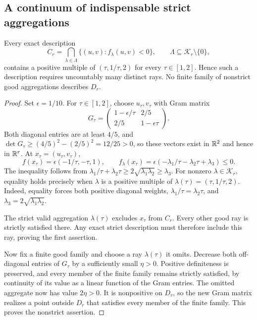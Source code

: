 \subsection{A continuum of indispensable strict aggregations}

\begin{theorem}\label{thm:indispensable-rays}
Every exact description
\[
 C_r=\bigcap_{\lambda\in\Lambda}\{(u,v):f_\lambda(u,v)<0\},
 \qquad \Lambda\subseteq\mathcal K_r\setminus\{0\},
\]
contains a positive multiple of $(\tau,1/\tau,2)$ for every
$\tau\in[1,2]$. Hence such a description requires uncountably many
distinct rays. No finite family of nonstrict good aggregations
describes $D_r$.
\end{theorem}
\begin{proof}
Set $\epsilon=1/10$. For $\tau\in[1,2]$, choose $u_\tau,v_\tau$
with Gram matrix
\begin{equation}\label{eq:ray-witness-gram}
 G_\tau=
 \begin{pmatrix}1-\epsilon/\tau&2/5\\2/5&1-\epsilon\tau\end{pmatrix}.
\end{equation}
Both diagonal entries are at least $4/5$, and
$\det G_\tau\geq(4/5)^2-(2/5)^2=12/25>0$, so these vectors exist
in $\mathbb R^2$ and hence in $\mathbb R^r$. At $x_\tau=(u_\tau,v_\tau)$,
\begin{equation}\label{eq:ray-witness-slack}
 f(x_\tau)=\epsilon(-1/\tau,-\tau,1),\qquad
 f_\lambda(x_\tau)
 =\epsilon(-\lambda_1/\tau-\lambda_2\tau+\lambda_3)\leq0.
\end{equation}
The inequality follows from
$\lambda_1/\tau+\lambda_2\tau\geq2\sqrt{\lambda_1\lambda_2}
\geq\lambda_3$. For nonzero $\lambda\in\mathcal K_r$, equality
holds precisely when $\lambda$ is a positive multiple of
$\lambda(\tau)=(\tau,1/\tau,2)$. Indeed, equality forces both
positive diagonal weights, $\lambda_1/\tau=\lambda_2\tau$, and
$\lambda_3=2\sqrt{\lambda_1\lambda_2}$.

The strict valid aggregation $\lambda(\tau)$ excludes $x_\tau$
from $C_r$. Every other good ray is strictly satisfied there. Any
exact strict description must therefore include this ray, proving
the first assertion.

Now fix a finite good family and choose a ray $\lambda(\tau)$
it omits. Decrease both off-diagonal entries of $G_\tau$ by a
sufficiently small $\eta>0$. Positive definiteness is preserved,
and every member of the finite family remains strictly satisfied,
by continuity of its value as a linear function of the Gram entries.
The omitted aggregate now has value $2\eta>0$. It is nonpositive
on $D_r$, so the new Gram matrix realizes a point outside $D_r$
that satisfies every member of the finite family. This proves
the nonstrict assertion.
\end{proof}

